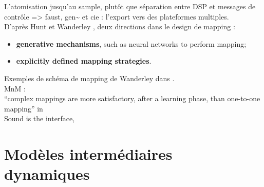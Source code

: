 




L’atomisation jusqu’au sample, plutôt que séparation entre DSP et messages de contrôle
=> faust, gen\textasciitilde{ } et cie : l’export vers des plateformes multiples.\\
\indent D'après Hunt et Wanderley \cite{hunt_mapping_2002}, deux directions dans le design de mapping :
\vspace{-1em}
\begin{itemize}[noitemsep]
	\item \textbf{generative mechanisms}, such as neural networks to perform mapping;
	\item \textbf{explicitly defined mapping strategies}.
\end{itemize}
Exemples de schéma de mapping de Wanderley dans \cite{wanderley_escher-modeling_1998}.\\
MnM : \cite{bevilacqua_mnm_2005}\\
``complex mappings are more satisfactory, after a learning phase, than one-to-one mapping'' in \cite{wanderley_mapping_2002}\\
Sound is the interface, \cite{di_scipio_sound_2003}


\section{Modèles intermédiaires dynamiques}
\label{sec:algorithms:MID}

